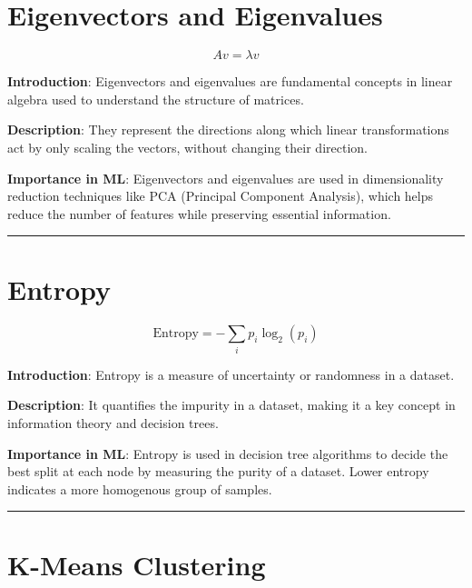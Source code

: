 \documentclass[
  12 pt,
  a4paper,
]{book}
\numberwithin{equation}{section}
\theoremstyle{plain}      %
\theoremstyle{definition} %
\theoremstyle{remark}     %
\theoremstyle{note}         %
\begin{document}
\newpage

\hypertarget{eigenvectors-and-eigenvalues}{%
\chapter{Eigenvectors and
Eigenvalues}\label{eigenvectors-and-eigenvalues}}

\[
A v = \lambda v
\]

\textbf{Introduction}: Eigenvectors and eigenvalues are fundamental
concepts in linear algebra used to understand the structure of matrices.

\textbf{Description}: They represent the directions along which linear
transformations act by only scaling the vectors, without changing their
direction.

\textbf{Importance in ML}: Eigenvectors and eigenvalues are used in
dimensionality reduction techniques like PCA (Principal Component
Analysis), which helps reduce the number of features while preserving
essential information.

\begin{center}\rule{0.5\linewidth}{0.5pt}\end{center}

\newpage

\hypertarget{entropy}{%
\chapter{Entropy}\label{entropy}}

\[
\text{Entropy} = - \sum_{i} p_i \log_2(p_i)
\]

\textbf{Introduction}: Entropy is a measure of uncertainty or randomness
in a dataset.

\textbf{Description}: It quantifies the impurity in a dataset, making it
a key concept in information theory and decision trees.

\textbf{Importance in ML}: Entropy is used in decision tree algorithms
to decide the best split at each node by measuring the purity of a
dataset. Lower entropy indicates a more homogenous group of samples.

\begin{center}\rule{0.5\linewidth}{0.5pt}\end{center}

\newpage

\hypertarget{k-means-clustering}{%
\chapter{K-Means Clustering}\label{k-means-clustering}}
\end{document}
